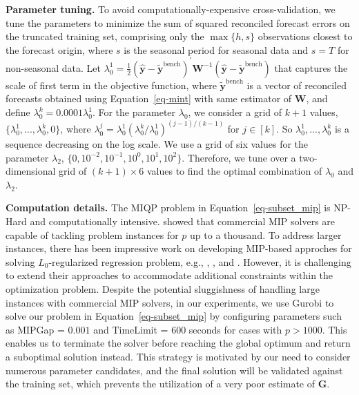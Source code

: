 \documentclass[11pt,a4paper,]{article}
\begin{document}
\textbf{Parameter tuning.} To avoid computationally-expensive
cross-validation, we tune the parameters to minimize the sum of squared
reconciled forecast errors on the truncated training set, comprising
only the \(\max\{h, s\}\) observations closest to the forecast origin,
where \(s\) is the seasonal period for seasonal data and \(s=T\) for
non-seasonal data. Let
\(\lambda_{0}^{1} = \frac{1}{2}\left(\hat{\boldsymbol{y}}-\tilde{\boldsymbol{y}}^{\text{bench}}\right)^{\prime} \boldsymbol{W}^{-1}\left(\hat{\boldsymbol{y}}-\tilde{\boldsymbol{y}}^{\text{bench}}\right)\)
that captures the scale of first term in the objective function, where
\(\tilde{\boldsymbol{y}}^{\text{bench}}\) is a vector of reconciled
forecasts obtained using Equation~\ref{eq-mint} with same estimator of
\(\boldsymbol{W}\), and define
\(\lambda_{0}^{k} = 0.0001\lambda_{0}^{1}\). For the parameter
\(\lambda_0\), we consider a grid of \(k+1\) values,
\(\{\lambda_{0}^{1},...,\lambda_{0}^{k}, 0\}\), where
\(\lambda_{0}^{j} = \lambda_{0}^{1}\left(\lambda_{0}^{k} / \lambda_{0}^{1}\right)^{(j-1) / (k-1)}\)
for \(j \in [k]\). So \(\lambda_{0}^{1},...,\lambda_{0}^{k}\) is a
sequence decreasing on the log scale. We use a grid of six values for
the parameter \(\lambda_2\),
\(\{0, 10^{-2}, 10^{-1}, 10^{0}, 10^{1}, 10^{2}\}\). Therefore, we tune
over a two-dimensional grid of \((k+1) \times 6\) values to find the
optimal combination of \(\lambda_0\) and \(\lambda_2\).

\textbf{Computation details.} The MIQP problem in
Equation~\ref{eq-subset_mip} is NP-Hard and computationally intensive.
\textcite{Bertsimas2016-ig} showed that commercial MIP solvers are
capable of tackling problem instances for \(p\) up to a thousand. To
address larger instances, there has been impressive work on developing
MIP-based approches for solving \(L_0\)-regularized regression problem,
e.g., \textcite{Bertsimas2016-ig}, \textcite{Hazimeh2020-xd}, and
\textcite{Hazimeh2022-hc}. However, it is challenging to extend their
approaches to accommodate additional constraints within the optimization
problem. Despite the potential sluggishness of handling large instances
with commercial MIP solvers, in our experiments, we use Gurobi to solve
our problem in Equation~\ref{eq-subset_mip} by configuring parameters
such as MIPGap = \(0.001\) and TimeLimit = \(600\) seconds for cases
with \(p > 1000\). This enables us to terminate the solver before
reaching the global optimum and return a suboptimal solution instead.
This strategy is motivated by our need to consider numerous parameter
candidates, and the final solution will be validated against the
training set, which prevents the utilization of a very poor estimate of
\(\boldsymbol{G}\).
\end{document}
